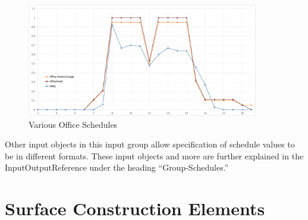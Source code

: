 \begin{figure}[hbtp]
\centering
\includegraphics[width=0.9\textwidth, height=0.9\textheight, keepaspectratio=true]{media/officeSchedules.png}
\caption{Various Office Schedules}
\end{figure}


Other input objects in this input group allow specification of schedule
values to be in different formats. These input objects and more are
further explained in the InputOutputReference under the heading ``Group-Schedules.''

\section{Surface Construction Elements}

